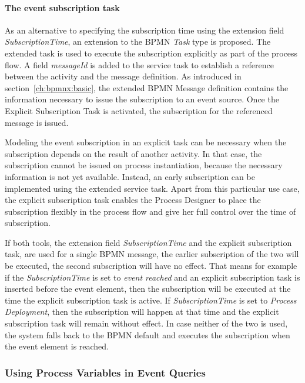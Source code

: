 \paragraph{The event subscription task\newline}
As an alternative to specifying the subscription time using the extension field \textit{SubscriptionTime}, an extension to the BPMN \textit{Task} type is proposed. 
The extended task is used to execute the subscription explicitly as part of the process flow.
A field \textit{messageId} is added to the service task to establish a reference between the activity and the message definition.
As introduced in section~\autoref{ch:bpmnx:basic}, the extended BPMN Message definition contains the information necessary to issue the subscription to an event source.
Once the Explicit Subscription Task is activated, the subscription for the referenced message is issued. 

Modeling the event subscription in an explicit task can be necessary when the subscription depends on the result of another activity. In that case, the subscription cannot be issued on process instantiation, because the necessary information is not yet available. Instead, an early subscription can be implemented using the extended service task.
Apart from this particular use case, the explicit subscription task enables the Process Designer to place the subscription flexibly in the process flow and give her full control over the time of subscription.

If both tools, the extension field \textit{SubscriptionTime} and the explicit subscription task, are used for a single BPMN message, the earlier subscription of the two will be executed, the second subscription will have no effect.
That means for example if the \textit{SubscriptionTime} is set to \textit{event reached} and an explicit subscription task is inserted before the event element, then the subscription will be executed at the time the explicit subscription task is active.
If \textit{SubscriptionTime} is set to \textit{Process Deployment}, then the subscription will happen at that time and the explicit subscription task will remain without effect.
In case neither of the two is used, the system falls back to the BPMN default and executes the subscription when the event element is reached.

\subsubsection{Using Process Variables in Event Queries}\label{ch:bpmnx:variables-in-queries}

